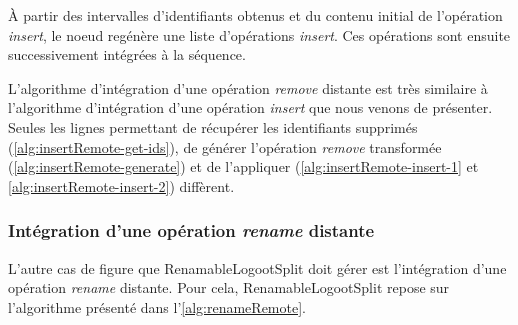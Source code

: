 \documentclass[12pt]{thesul}
\begin{document}
À partir des intervalles d'identifiants obtenus et du contenu initial de l'opération \emph{insert}, le noeud regénère une liste d'opérations \emph{insert}.
Ces opérations sont ensuite successivement intégrées à la séquence.

L'algorithme d'intégration d'une opération \emph{remove} distante est très similaire à l'algorithme d'intégration d'une opération \emph{insert} que nous venons de présenter.
Seules les lignes permettant de récupérer les identifiants supprimés (\ref{alg:insertRemote-get-ids}), de générer l'opération \emph{remove} transformée (\ref{alg:insertRemote-generate}) et de l'appliquer (\ref{alg:insertRemote-insert-1} et \ref{alg:insertRemote-insert-2}) diffèrent.

\subsubsection{Intégration d'une opération \emph{rename} distante}

\label{sec:integration-process-rename-op}

L'autre cas de figure que RenamableLogootSplit doit gérer est l'intégration d'une opération \emph{rename} distante.
Pour cela, RenamableLogootSplit repose sur l'algorithme présenté dans l'\autoref{alg:renameRemote}.
\end{document}

